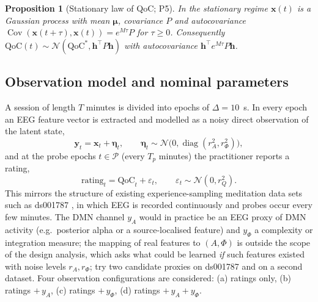 \documentclass[12pt,a4paper]{article}
\theoremstyle{plain}
\newtheorem{proposition}[theorem]{Proposition}
\theoremstyle{definition}
\theoremstyle{remark}
\newcommand{\QoC}{\mathrm{QoC}}
\newcommand{\rA}{r_{A}}
\newcommand{\rPhi}{r_{\Phi}}
\newcommand{\rQ}{r_{Q}}
\newcommand{\Cov}{\operatorname{Cov}}
\newcommand{\diag}{\operatorname{diag}}
\newcommand{\muv}{\boldsymbol{\mu}}
\newcommand{\xv}{\mathbf{x}}
\newcommand{\yv}{\mathbf{y}}
\newcommand{\hv}{\mathbf{h}}
\begin{document}
\begin{proposition}[Stationary law of QoC; P5]
\label{prop:p5}
In the stationary regime $\xv(t)$ is a Gaussian process with mean $\muv$, covariance $P$ and autocovariance $\Cov(\xv(t+\tau),\xv(t))=e^{M\tau}P$ for $\tau\ge 0$. Consequently $\QoC(t)\sim\mathcal N(\QoC^*,\hv^\top P\hv)$ with autocovariance $\hv^\top e^{M\tau}P\hv$.
\end{proposition}

\subsection{Observation model and nominal parameters}
\label{sec:obs}

A session of length $T$ minutes is divided into epochs of $\Delta=10$~s. In every epoch an EEG feature vector is extracted and modelled as a noisy direct observation of the latent state,
\begin{equation}
  \yv_t=\xv_t+\boldsymbol\eta_t,\qquad \boldsymbol\eta_t\sim\mathcal N\bigl(0,\diag(\rA^2,\rPhi^2)\bigr),
  \label{eq:obsEEG}
\end{equation}
and at the probe epochs $t\in\mathcal P$ (every $T_p$ minutes) the practitioner reports a rating,
\begin{equation}
  \mathrm{rating}_t=\QoC_t+\varepsilon_t,\qquad \varepsilon_t\sim\mathcal N(0,\rQ^2).
  \label{eq:obsRating}
\end{equation}
This mirrors the structure of existing experience-sampling meditation data sets such as ds001787 \citep{Brandmeyer2018}, in which EEG is recorded continuously and probes occur every few minutes. The DMN channel $y_A$ would in practice be an EEG proxy of DMN activity (e.g.\ posterior alpha or a source-localised feature) and $y_\Phi$ a complexity or integration measure; the mapping of real features to $(A,\Phi)$ is outside the scope of the design analysis, which asks what could be learned \emph{if} such features existed with noise levels $\rA,\rPhi$;  try two candidate proxies on ds001787 and on a second dataset. Four observation configurations are considered: (a) ratings only, (b) ratings $+\,y_A$, (c) ratings $+\,y_\Phi$, (d) ratings $+\,y_A+y_\Phi$.
\end{document}
